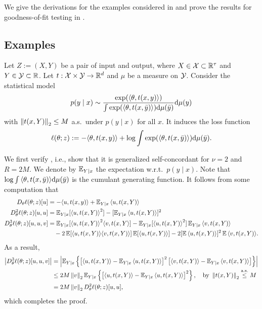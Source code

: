 We give the derivations for the examples considered in  and prove the results for goodness-of-fit testing in .

\subsection{Examples}
\label{sub:append:examples}

\begin{example}
    Let $Z := (X, Y)$ be a pair of input and output, where $X \in \mathcal{X} \subset {\mathbb R}^\tau$ and $Y \in \mathcal{Y} \subset {\mathbb R}$.
    Let $t: \mathcal{X} \times \mathcal{Y} \rightarrow {\mathbb R}^d$ and $\mu$ be a measure on $\mathcal{Y}$.
    Consider the statistical model
    \begin{align*}
        p(y \mid x) \sim \frac{\exp({\langle \theta, t(x, y) \rangle})}{\int \exp({\langle \theta, t(x, \bar y) \rangle}) \mathrm{d} \mu(\bar y)} \mathrm{d} \mu(y)
    \end{align*}
    with $\left\lVert t(x, Y) \right\rVert_2 \le M$ a.s.~under $p(y \mid x)$ for all $x$.
    It induces the loss function
    \begin{align*}
        \ell(\theta; z) := -{\langle \theta, t(x, y) \rangle} + \log{\int \exp({\langle \theta, t(x, \bar y) \rangle}) \mathrm{d}\mu(\bar y)}.
    \end{align*}
    
    We first verify , i.e., show that it is generalized self-concordant for $\nu = 2$ and $R = 2M$.
    We denote by $\operatorname{\mathbb E}_{Y\mid x}$ the expectation w.r.t.~$p(y \mid x)$.
    Note that $\log{\int {\langle \theta, t(x, \bar y) \rangle} \mathrm{d}\mu(\bar y)}$ is the cumulant generating function.
    It follows from some computation that
    \begin{align*}
        D_\theta \ell(\theta; z) [u] &= -{\langle u, t(x, y) \rangle} + \operatorname{\mathbb E}_{Y\mid x}{\langle u, t(x, Y) \rangle} \\
        D_\theta^2 \ell(\theta; z) [u, u] &= \operatorname{\mathbb E}_{Y \mid x}[{\langle u, t(x, Y) \rangle}^2] - [\operatorname{\mathbb E}_{Y \mid x}{\langle u, t(x, Y) \rangle}]^2 \\
        D_\theta^3 \ell(\theta; z)[u, u, v] &= \operatorname{\mathbb E}_{Y \mid x}[{\langle u, t(x, Y) \rangle}^2 {\langle v, t(x, Y \rangle}] - \operatorname{\mathbb E}_{Y \mid x}[{\langle u, t(x, Y) \rangle}^2] \operatorname{\mathbb E}_{Y \mid x}{\langle v, t(x, Y) \rangle} \\
        &\quad - 2\operatorname{\mathbb E}[{\langle u, t(x, Y) \rangle} {\langle v, t(x, Y) \rangle}] \operatorname{\mathbb E}[{\langle u, t(x, Y) \rangle}] - 2[\operatorname{\mathbb E}{\langle u, t(x, Y) \rangle}]^2 \operatorname{\mathbb E}{\langle v, t(x, Y) \rangle}.
    \end{align*}
    As a result,
    \begin{align*}
        \left| D_\theta^3 \ell(\theta; z)[u, u, v] \right|
        &= \left| \operatorname{\mathbb E}_{Y \mid x}\left\{ \left[ {\langle u, t(x, Y) \rangle} - \operatorname{\mathbb E}_{Y\mid x}{\langle u, t(x, Y) \rangle} \right]^2 \left[ {\langle v, t(x, Y) \rangle} - \operatorname{\mathbb E}_{Y\mid x}{\langle v, t(x, Y) \rangle} \right] \right\} \right| \\
        &\le 2M \left\lVert v \right\rVert_2 \operatorname{\mathbb E}_{Y \mid x}\left\{ \left[ {\langle u, t(x, Y) \rangle} - \operatorname{\mathbb E}_{Y\mid x}{\langle u, t(x, Y) \rangle} \right]^2 \right\}, \quad \mbox{by } \left\lVert t(x, Y) \right\rVert_2 \overset{\mbox{\scriptsize a.s.}}{\le} M \\
        &= 2M \left\lVert v \right\rVert_2 D_\theta^2 \ell(\theta; z)[u, u],
    \end{align*}
    which completes the proof.
    

\end{example}
